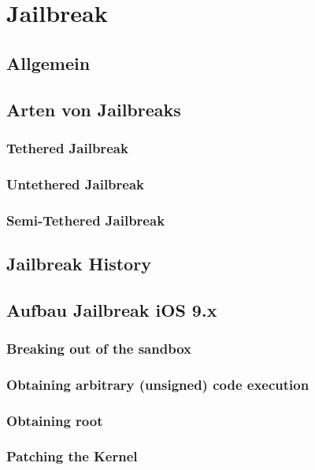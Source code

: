 %
%
%
% 


\chapter{Jailbreak}
\label{ch:JB}

\section{Allgemein}
\label{sec:JBAllgemein}

\section{Arten von Jailbreaks}
\label{sec:JBArten}

\subsection{Tethered Jailbreak}
\label{sec:JBTethered}

\subsection{Untethered Jailbreak}
\label{sec:JBUnTethered}

\subsection{Semi-Tethered Jailbreak}
\label{sec:JBSemiTethered}

\section{Jailbreak History}
\label{sec:JBHistory}

\section{Aufbau Jailbreak iOS 9.x}
\cite{TaiG[1]}
\cite{TaiG[2]}
\cite{TaiG[3]}

\label{sec:JBAufbau}

\subsection{Breaking out of the sandbox}
\label{sec:JBStep1}

\subsection{Obtaining arbitrary (unsigned) code execution}

\label{sec:JBStep2}

\subsection{Obtaining root}
\label{sec:JBStep3}

\subsection{Patching the Kernel}
\label{sec:JBStep4}
